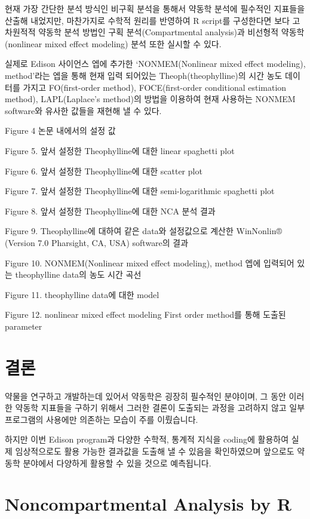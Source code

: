 \documentclass[]{krantz}
\theoremstyle{definition}
\theoremstyle{definition}
\theoremstyle{definition}
\theoremstyle{remark}
\begin{document}
현재 가장 간단한 분석 방식인 비구획 분석을 통해서 약동학 분석에 필수적인
지표들을 산출해 내었지만, 마찬가지로 수학적 원리를 반영하여 R script를
구성한다면 보다 고차원적적 약동학 분석 방법인 구획 분석(Compartmental
analysis)과 비선형적 약동학(nonlinear mixed effect modeling) 분석 또한
실시할 수 있다.

실제로 Edison 사이언스 엡에 추가한 `NONMEM(Nonlinear mixed effect
modeling), method'라는 엡을 통해 현재 입력 되어있는
Theoph(theophylline)의 시간 농도 데이터를 가지고 FO(first-order method),
FOCE(first-order conditional estimation method), LAPL(Laplace's
method)의 방법을 이용하여 현재 사용하는 NONMEM software와 유사한 값들을
재현해 낼 수 있다.

Figure 4 논문 내에서의 설정 값

Figure 5. 앞서 설정한 Theophylline에 대한 linear spaghetti plot

Figure 6. 앞서 설정한 Theophylline에 대한 scatter plot

Figure 7. 앞서 설정한 Theophylline에 대한 semi-logarithmic spaghetti
plot

Figure 8. 앞서 설정한 Theophylline에 대한 NCA 분석 결과

Figure 9. Theophylline에 대하여 같은 data와 설정값으로 계산한 WinNonlin®
(Version 7.0 Pharsight, CA, USA) software의 결과

Figure 10. NONMEM(Nonlinear mixed effect modeling), method 엡에 입력되어
있는 theophylline data의 농도 시간 곡선

Figure 11. theophylline data에 대한 model

Figure 12. nonlinear mixed effect modeling First order method를 통해
도출된 parameter

\section{결론}\label{conclusion}

약물을 연구하고 개발하는데 있어서 약동학은 굉장히 필수적인 분야이며, 그
동안 이러한 약동학 지표들을 구하기 위해서 그러한 결론이 도출되는 과정을
고려하지 않고 일부 프로그램의 사용에만 의존하는 모습이 주를 이뤘습니다.

하지만 이번 Edison program과 다양한 수학적, 통계적 지식을 coding에
활용하여 실제 임상적으로도 활용 가능한 결과값을 도출해 낼 수 있음을
확인하였으며 앞으로도 약동학 분야에서 다양하게 활용할 수 있을 것으로
예측됩니다.

\section{Noncompartmental Analysis by
R}\label{noncompartmental-analysis-by-r}
\end{document}
